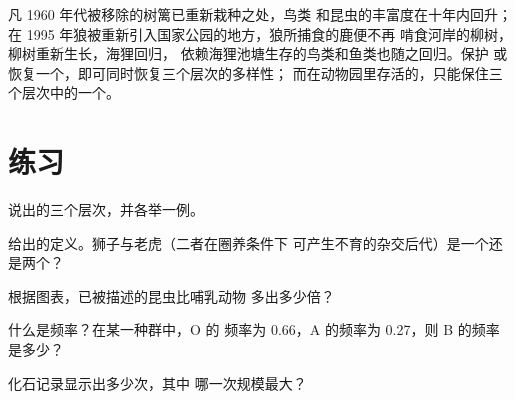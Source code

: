 \begin{example}[损失的逆转]\label{ex:g10:biodiversity-scales:reversing}
凡 1960 年代被移除的树篱已重新栽种之处，鸟类
和昆虫的丰富度在十年内回升；在
1995 年狼被重新引入国家公园的地方，狼所捕食的鹿便不再
啃食河岸的柳树，柳树重新生长，海狸回归，
依赖海狸池塘生存的鸟类和鱼类也随之回归。保护
或恢复一个，即可同时恢复三个层次的多样性；
而在动物园里存活的，只能保住三个层次中的一个。
\end{example}

\section{练习}

\begin{exercise}[$\star$]\label{exo:g10:biodiversity-scales:1}
说出的三个层次，并各举一例。
\end{exercise}

\begin{exercise}[$\star$]\label{exo:g10:biodiversity-scales:2}
给出的定义。狮子与老虎（二者在圈养条件下
可产生不育的杂交后代）是一个还是两个？
\end{exercise}

\begin{exercise}[$\star$]\label{exo:g10:biodiversity-scales:3}
根据图表，已被描述的昆虫比哺乳动物
多出多少倍？
\end{exercise}

\begin{exercise}[$\star$]\label{exo:g10:biodiversity-scales:4}
什么是频率？在某一种群中，O 的
频率为 0.66，A 的频率为 0.27，则 B 的频率是多少？
\end{exercise}

\begin{exercise}[$\star$]\label{exo:g10:biodiversity-scales:5}
化石记录显示出多少次，其中
哪一次规模最大？
\end{exercise}

